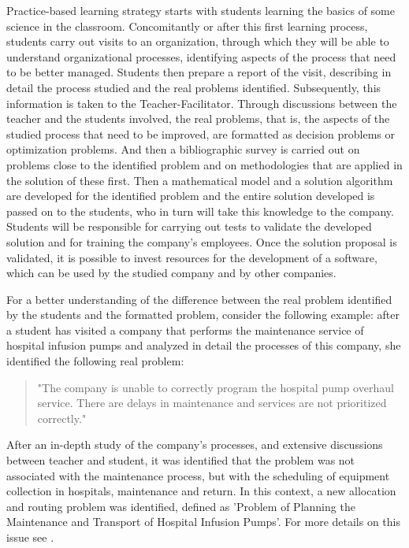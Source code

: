 \documentclass[preprint,12pt,authoryear]{elsarticle}
\begin{document}
Practice-based learning strategy starts with students learning the basics of some science in the classroom. Concomitantly or after this first learning process, students carry out visits to an organization, through which they will be able to understand organizational processes, identifying aspects of the process that need to be better managed. Students then prepare a report of the visit, describing in detail the process studied and the real problems identified. Subsequently, this information is taken to the Teacher-Facilitator. Through discussions between the teacher and the students involved, the real problems, that is, the aspects of the studied process that need to be improved, are formatted as decision problems or optimization problems. And then a bibliographic survey is carried out on problems close to the identified problem and on methodologies that are applied in the solution of these first. Then a mathematical model and a solution algorithm are developed for the identified problem and the entire solution developed is passed on to the students, who in turn will take this knowledge to the company. Students will be responsible for carrying out tests to validate the developed solution and for training the company's employees.  Once the solution proposal is validated, it is possible to invest resources for the development of a software, which can be used by the studied company and by other companies.

For a better understanding of the difference between the real problem identified by the students and the formatted problem, consider the following example: after a student has visited a company that performs the maintenance service of hospital infusion pumps and analyzed in detail the processes of this company, she identified the following real problem:

\begin{quote}
"The company is unable to correctly program the hospital pump overhaul service. There are delays in maintenance and services are not prioritized correctly."
\end{quote}

After an in-depth study of the company's processes, and extensive discussions between teacher and student, it was identified that the problem was not associated with the maintenance process, but with the scheduling of equipment collection in hospitals, maintenance and return. In this context, a new allocation and routing problem was identified, defined as 'Problem of Planning the Maintenance and Transport of Hospital Infusion Pumps'. For more details on this issue see \cite{FragaEtAl2021}.
\end{document}
